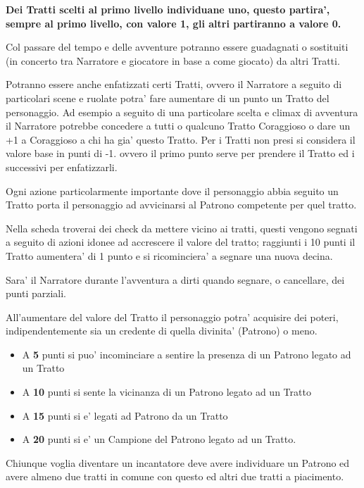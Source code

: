 \documentclass[a4paper,11pt,twoside,openany]{dndbook}
\begin{document}
\textbf{Dei Tratti scelti al primo livello individuane uno, questo partira', sempre al primo livello, con valore 1, gli altri partiranno a valore 0.}

Col passare del tempo e delle avventure potranno essere guadagnati o sostituiti (in concerto tra Narratore e giocatore in base a come giocato) da altri Tratti.

Potranno essere anche enfatizzati certi Tratti, ovvero il Narratore a seguito di particolari scene e ruolate potra' fare aumentare di un punto un Tratto del personaggio. Ad esempio a seguito di una particolare scelta e climax di avventura il Narratore potrebbe concedere a tutti o qualcuno Tratto Coraggioso o dare un +1 a Coraggioso a chi ha gia' questo Tratto. Per i Tratti non presi si considera il valore base in punti di -1. ovvero il primo punto serve per prendere il Tratto ed i successivi per enfatizzarli.

Ogni azione particolarmente importante dove il personaggio abbia seguito un Tratto porta il personaggio ad avvicinarsi al Patrono competente per quel tratto.

Nella scheda troverai dei check da mettere vicino ai tratti, questi vengono segnati a seguito di azioni idonee ad accrescere il valore del tratto; raggiunti i 10 punti il Tratto aumentera' di 1 punto e si ricominciera' a segnare una nuova decina.

Sara' il Narratore durante l'avventura a dirti quando segnare, o cancellare, dei punti parziali.

All'aumentare del valore del Tratto il personaggio potra' acquisire dei poteri, indipendentemente sia un credente di quella divinita'
(Patrono) o meno.

\begin{itemize}
	\item A \textbf{5} punti si puo' incominciare a sentire la presenza di un Patrono
legato ad un Tratto
	\item A \textbf{10} punti si sente la vicinanza di un Patrono legato ad un Tratto
	\item A \textbf{15} punti si e' legati ad Patrono da un Tratto
	\item A \textbf{20} punti si e' un Campione del Patrono legato ad un Tratto.
\end{itemize}

Chiunque voglia diventare un incantatore deve avere individuare un Patrono ed avere almeno due tratti in comune con questo ed altri due tratti a piacimento.
\end{document}
